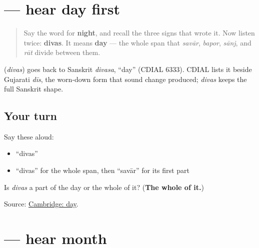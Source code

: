 \section[\texorpdfstring{\gu{દિવસ} (divas)}{દિવસ (divas)}]{ — hear day first}

\label{lesson:GU-C24-hear-divas}



\begin{quote}
Say the word for \textbf{night}, and recall the three signs that wrote it. Now listen twice: \textbf{divas}. It means \textbf{day} — the whole span that \emph{savār}, \emph{bapor}, \emph{sānj}, and \emph{rāt} divide between them.
\end{quote}

\begin{cousinweb}
\textbf{} (\emph{divas}) goes back to Sanskrit \emph{divasa}, \textquotedblleft{}day\textquotedblright{} (CDIAL 6333). CDIAL lists it beside Gujarati \emph{dīs}, the worn-down form that sound change produced; \emph{divas} keeps the full Sanskrit shape.
\end{cousinweb}

\subsection*{Your turn}
Say these aloud:

\begin{itemize}
\raggedright
  \item \textquotedblleft{}divas\textquotedblright{}
  \item \textquotedblleft{}divas\textquotedblright{} for the whole span, then \textquotedblleft{}savār\textquotedblright{} for its first part
\end{itemize}

\begin{tcolorbox}[breakable,colback=teal!4,colframe=teal!35!black,title={Before you move on}]
Is \emph{divas} a part of the day or the whole of it? (\textbf{The whole of it.})

Source: \href{https://dictionary.cambridge.org/dictionary/english-gujarati/day}{Cambridge: day}.
\end{tcolorbox}
\section[\texorpdfstring{\gu{મહિનો} (mahino)}{મહિનો (mahino)}]{ — hear month}

\label{lesson:GU-C24-hear-mahino}



